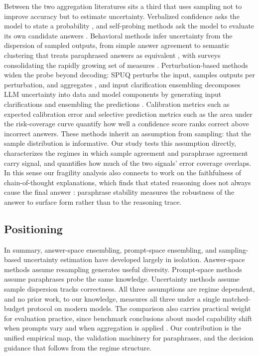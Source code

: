 Between the two aggregation literatures sits a third that uses sampling not to improve accuracy but to estimate uncertainty. Verbalized confidence asks the model to state a probability \citep{tian2023just,xiong2024can}, and self-probing methods ask the model to evaluate its own candidate answers \citep{kadavath2022language}. Behavioral methods infer uncertainty from the dispersion of sampled outputs, from simple answer agreement to semantic clustering that treats paraphrased answers as equivalent \citep{kuhn2023semantic,farquhar2024detecting}, with surveys consolidating the rapidly growing set of measures \citep{liu2025uqsurvey}. Perturbation-based methods widen the probe beyond decoding: SPUQ perturbs the input, samples outputs per perturbation, and aggregates \citep{gao2024spuq}, and input clarification ensembling decomposes LLM uncertainty into data and model components by generating input clarifications and ensembling the predictions \citep{hou2023decomposing}. Calibration metrics such as expected calibration error \citep{guo2017calibration} and selective prediction metrics such as the area under the risk-coverage curve quantify how well a confidence score ranks correct above incorrect answers. These methods inherit an assumption from sampling: that the sample distribution is informative. Our study tests this assumption directly, characterizes the regimes in which sample agreement and paraphrase agreement carry signal, and quantifies how much of the two signals' error coverage overlaps. In this sense our fragility analysis also connects to work on the faithfulness of chain-of-thought explanations, which finds that stated reasoning does not always cause the final answer \citep{lanham2023measuring}: paraphrase stability measures the robustness of the answer to surface form rather than to the reasoning trace.

\subsection{Positioning}

In summary, answer-space ensembling, prompt-space ensembling, and sampling-based uncertainty estimation have developed largely in isolation. Answer-space methods assume resampling generates useful diversity. Prompt-space methods assume paraphrases probe the same knowledge. Uncertainty methods assume sample dispersion tracks correctness. All three assumptions are regime dependent, and no prior work, to our knowledge, measures all three under a single matched-budget protocol on modern models. The comparison also carries practical weight for evaluation practice, since benchmark conclusions about model capability shift when prompts vary \citep{mizrahi2024state} and when aggregation is applied \citep{wang2023selfconsistency}. Our contribution is the unified empirical map, the validation machinery for paraphrases, and the decision guidance that follows from the regime structure.
